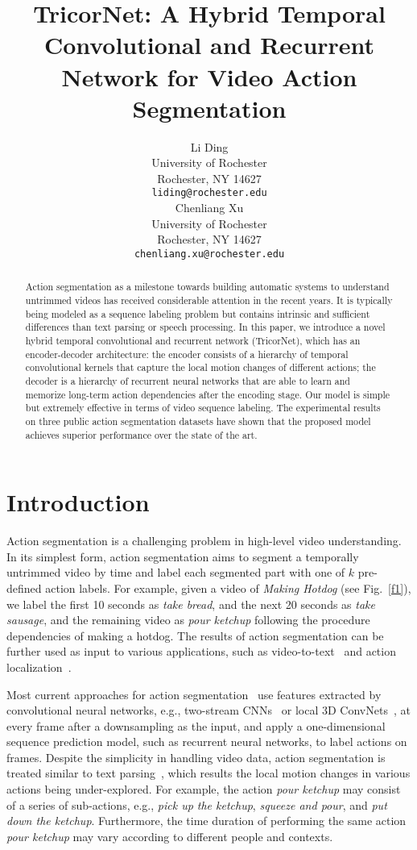 \documentclass{article}
\title{TricorNet: A Hybrid Temporal Convolutional and Recurrent Network for Video Action Segmentation}
\author{
Li Ding \\
University of Rochester \\
Rochester, NY 14627 \\
\texttt{liding@rochester.edu} \\
\And
Chenliang Xu \\
University of Rochester \\
Rochester, NY 14627 \\
\texttt{chenliang.xu@rochester.edu}
}
\begin{document}
\maketitle

\begin{abstract}
Action segmentation as a milestone towards building automatic systems to understand untrimmed videos has received considerable attention in the recent years. It is typically being modeled as a sequence labeling problem but contains intrinsic and sufficient differences than text parsing or speech processing. In this paper, we introduce a novel hybrid temporal convolutional and recurrent network (TricorNet), which has an encoder-decoder architecture: the encoder consists of a hierarchy of temporal convolutional kernels that capture the local motion changes of different actions; the decoder is a hierarchy of recurrent neural networks that are able to learn and memorize long-term action dependencies after the encoding stage. Our model is simple but extremely effective in terms of video sequence labeling. The experimental results on three public action segmentation datasets have shown that the proposed model achieves superior performance over the state of the art. 
\end{abstract}



\section{Introduction}
\label{sec:intro}

Action segmentation is a challenging problem in high-level video understanding. In its simplest form, action segmentation aims to segment a temporally untrimmed video by time and label each segmented part with one of $k$ pre-defined action labels. For example, given a video of \textit{Making Hotdog} (see Fig.~\ref{f1}), we label the first 10 seconds as \textit{take bread}, and the next 20 seconds as \textit{take sausage}, and the remaining video as \textit{pour ketchup} following the procedure dependencies of making a hotdog. The results of action segmentation can be further used as input to various applications, such as video-to-text~\cite{DaXuDoCVPR2013} and action localization~\cite{MeGeSnECCV2016}. 

Most current approaches for action segmentation~\cite{YeRuJiARXIV2015, SiMaJoCVPR2016, HuFeNiECCV2016} use features extracted by convolutional neural networks, e.g., two-stream CNNs~\cite{SiZiNIPS2014} or local 3D ConvNets~\cite{TrBoFeICCV2015}, at every frame after a downsampling as the input, and apply a one-dimensional sequence prediction model, such as recurrent neural networks, to label actions on frames. Despite the simplicity in handling video data, action segmentation is treated similar to text parsing~\cite{CrHuACL2016}, which results the local motion changes in various actions being under-explored. For example, the action \textit{pour ketchup} may consist of a series of sub-actions, e.g., \textit{pick up the ketchup}, \textit{squeeze and pour}, and \textit{put down the ketchup}. Furthermore, the time duration of performing the same action \textit{pour ketchup} may vary according to different people and contexts. 
\end{document}
